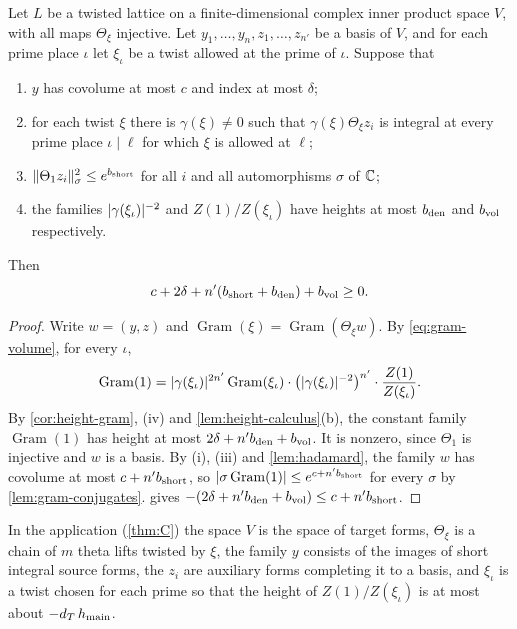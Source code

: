 \begin{theorem}\label{thm:twist-for-each-prime}
Let $L$ be a twisted lattice on a finite-dimensional complex inner product space $V$, with all maps
$\Theta_\xi$ injective. Let $y_1,\dots,y_n,z_1,\dots,z_{n'}$ be a basis of $V$, and for each prime
place $\iota$ let $\xi_\iota$ be a twist allowed at the prime of $\iota$. Suppose that
\begin{enumerate}[label=\textup{(\roman*)}]
\item $y$ has covolume at most $c$ and index at most $\delta$;
\item for each twist $\xi$ there is $\gamma(\xi)\neq0$ such that $\gamma(\xi)\Theta_\xi z_i$ is
integral at every prime place $\iota\mid\ell$ for which $\xi$ is allowed at $\ell$;
\item $\lVert \Theta_1z_i\rVert_\sigma^2\le e^{b_{\rm short}}$ for all $i$ and all automorphisms $\sigma$
of $\mathbb{C}$;
\item the families $\lvert \gamma(\xi_\iota)\rvert^{-2}$ and $Z(1)/Z(\xi_\iota)$ have heights at most
$b_{\rm den}$ and $b_{\rm vol}$ respectively.
\end{enumerate}
Then
\[
  c+2\delta+n'(b_{\rm short}+b_{\rm den})+b_{\rm vol}\ge0.
\]
\end{theorem}

\begin{proof}
Write $w=(y,z)$ and $\operatorname{Gram}(\xi)=\operatorname{Gram}(\Theta_\xi w)$. By
\eqref{eq:gram-volume}, for every $\iota$,
\[
  \operatorname{Gram}(1)=\lvert \gamma(\xi_\iota)\rvert^{2n'}\operatorname{Gram}(\xi_\iota)\cdot
  \bigl(\lvert \gamma(\xi_\iota)\rvert^{-2}\bigr)^{n'}\cdot\frac{Z(1)}{Z(\xi_\iota)}.
\]
By \cref{cor:height-gram}, (iv) and \cref{lem:height-calculus}(b), the constant family
$\operatorname{Gram}(1)$ has height at most $2\delta+n'b_{\rm den}+b_{\rm vol}$. It is nonzero, since
$\Theta_1$ is injective and $w$ is a basis. By (i), (iii) and \cref{lem:hadamard}, the family $w$ has
covolume at most $c+n'b_{\rm short}$, so $\lvert \sigma\operatorname{Gram}(1)\rvert\le e^{c+n'b_{\rm short}}$
for every $\sigma$ by \cref{lem:gram-conjugates}.  gives
$-(2\delta+n'b_{\rm den}+b_{\rm vol})\le c+n'b_{\rm short}$.
\end{proof}

In the application (\cref{thm:C}) the space $V$ is the space of target forms, $\Theta_\xi$ is a chain
of $m$ theta lifts twisted by $\xi$, the family $y$ consists of the images of short integral source
forms, the $z_i$ are auxiliary forms completing it to a basis, and $\xi_\iota$ is a twist chosen for
each prime so that the height of $Z(1)/Z(\xi_\iota)$ is at most about $-d_T\,h_{\mathrm{main}}$.
